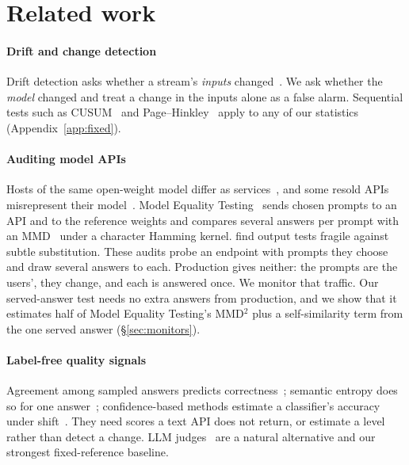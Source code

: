 \documentclass[11pt]{article}
\begin{document}
\section{Related work}

\paragraph{Drift and change detection}
Drift detection asks whether a stream's \emph{inputs} changed~\citep{gama2014survey,
rabanser2019failing,lipton2018detecting}. We ask whether the \emph{model} changed
and treat a change in the inputs alone as a false alarm. Sequential tests such as
CUSUM~\citep{page1954continuous} and Page--Hinkley~\citep{hinkley1971inference}
apply to any of our statistics (Appendix~\ref{app:fixed}).

\paragraph{Auditing model APIs}
Hosts of the same open-weight model differ as services~\citep{li2026sameservice},
and some resold APIs misrepresent their model~\citep{zhang2026shadow}. Model
Equality Testing~\citep{gao2025model} sends chosen prompts to an API and to the
reference weights and compares several answers per prompt with an
MMD~\citep{gretton2012kernel} under a character Hamming kernel.
\citet{cai2025substitution} find output tests fragile against subtle substitution.
These audits probe an endpoint with prompts they choose and draw several answers
to each. Production gives neither: the prompts are the users', they change, and
each is answered once. We monitor that traffic. Our served-answer test needs no
extra answers from production, and we show that it estimates half of Model
Equality Testing's MMD$^2$ plus a self-similarity term from the one served answer
(\S\ref{sec:monitors}).

\paragraph{Label-free quality signals}
Agreement among sampled answers predicts correctness~\citep{wang2023selfconsistency,
manakul2023selfcheckgpt}; semantic entropy does so for one
answer~\citep{kuhn2023semantic}; confidence-based methods estimate a classifier's
accuracy under shift~\citep{garg2022atc,deng2021labels}. They need scores a text
API does not return, or estimate a level rather than detect a change. LLM
judges~\citep{zheng2023judging} are a natural alternative and our strongest
fixed-reference baseline.
\end{document}
